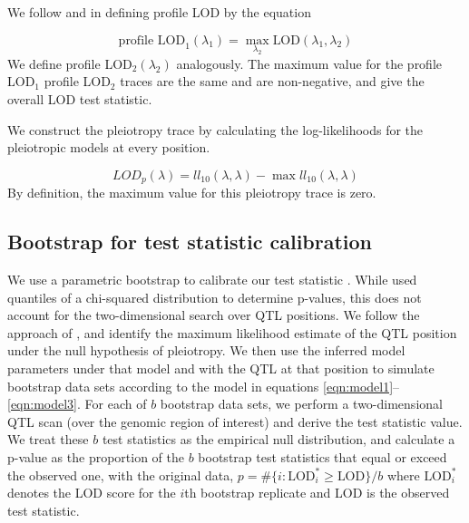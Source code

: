\documentclass[oneside]{book}\usepackage[]{graphicx}\usepackage[]{color}
\begin{document}
We follow \citet{zeng2000genetic} and \citet{tian2016dissection} in
defining profile LOD by the equation

\begin{equation}
\text{profile LOD}_1(\lambda_1) = \max_{\lambda_2}\text{LOD}(\lambda_1, \lambda_2)
\label{eq:profilelod}
\end{equation}
We define profile LOD$_2(\lambda_2)$ analogously.
The maximum value for the profile LOD$_1$
profile LOD$_2$ traces are the same and are non-negative, and give the
overall LOD test statistic.

We construct the pleiotropy trace by calculating the log-likelihoods
for the pleiotropic models at every position.

\begin{equation}
LOD_{p}(\lambda) = ll_{10}(\lambda, \lambda) - \max ll_{10}(\lambda, \lambda)
\label{eq:lodp}
\end{equation}
By definition, the maximum value for this pleiotropy trace
is zero.






\subsection{Bootstrap for test statistic calibration}

We use a parametric bootstrap to calibrate our test statistic
\citep{efron1979}. While \citet{jiang1995multiple} used quantiles of a
chi-squared distribution to determine p-values, this does not account
for the two-dimensional search over QTL positions.
We follow the approach of \citet{tian2016dissection}, and identify
the maximum likelihood estimate of the QTL position under the null
hypothesis of pleiotropy.
We then use the inferred model parameters under that model and with
the QTL at that position to simulate bootstrap data sets according to
the model in equations \ref{eqn:model1}--\ref{eqn:model3}.
For each of $b$ bootstrap data sets, we
perform a two-dimensional QTL scan (over the genomic region of
interest) and derive the test
statistic value. We treat these $b$ test statistics as the
empirical null distribution, and calculate a p-value as the
proportion of the $b$ bootstrap test statistics that equal or exceed
the observed one, with the original data,
$p = \# \{ i:\text{LOD}^*_i \geq \text{LOD}\} / b$
where $\text{LOD}_i^*$ denotes the LOD score for the $i$th bootstrap
replicate and LOD is the observed test statistic.
\end{document}
